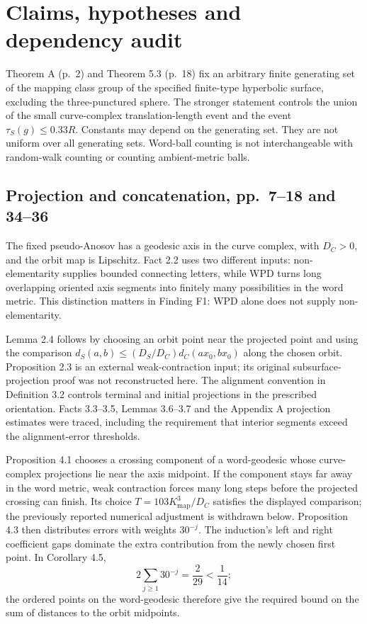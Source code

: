 \documentclass[10pt]{article}
\begin{document}
\section*{Claims, hypotheses and dependency audit}
Theorem A (p. 2) and Theorem 5.3 (p. 18) fix an arbitrary finite generating set of the mapping class group of the specified finite-type hyperbolic surface, excluding the three-punctured sphere. The stronger statement controls the union of the small curve-complex translation-length event and the event \(\tau_S(g)\le0.33R\). Constants may depend on the generating set. They are not uniform over all generating sets. Word-ball counting is not interchangeable with random-walk counting or counting ambient-metric balls.\par
\subsection*{Projection and concatenation, pp. 7–18 and 34–36}
The fixed pseudo-Anosov has a geodesic axis in the curve complex, with \(D_C>0\), and the orbit map is Lipschitz. Fact 2.2 uses two different inputs: non-elementarity supplies bounded connecting letters, while WPD turns long overlapping oriented axis segments into finitely many possibilities in the word metric. This distinction matters in Finding F1: WPD alone does not supply non-elementarity.\par
Lemma 2.4 follows by choosing an orbit point near the projected point and using the comparison \(d_S(a,b)\le(D_S/D_C)d_C(ax_0,bx_0)\) along the chosen orbit. Proposition 2.3 is an external weak-contraction input; its original subsurface-projection proof was not reconstructed here. The alignment convention in Definition 3.2 controls terminal and initial projections in the prescribed orientation. Facts 3.3–3.5, Lemmas 3.6–3.7 and the Appendix A projection estimates were traced, including the requirement that interior segments exceed the alignment-error thresholds.\par
Proposition 4.1 chooses a crossing component of a word-geodesic whose curve-complex projections lie near the axis midpoint. If the component stays far away in the word metric, weak contraction forces many long steps before the projected crossing can finish. Its choice \(T=103K_{\mathrm{map}}^3/D_C\) satisfies the displayed comparison; the previously reported numerical adjustment is withdrawn below. Proposition 4.3 then distributes errors with weights \(30^{-j}\). The induction’s left and right coefficient gaps dominate the extra contribution from the newly chosen first point. In Corollary 4.5, \[2\sum_{j\ge1}30^{-j}=\frac2{29}<\frac1{14};\] the ordered points on the word-geodesic therefore give the required bound on the sum of distances to the orbit midpoints.\par
\end{document}

